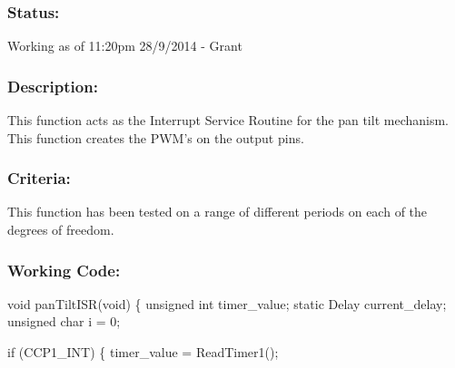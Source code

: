 \documentclass[]{article}
\begin{document}
\subsubsection{Status:}
Working as of 11:20pm 28/9/2014 - Grant

\subsubsection{Description:}
This function acts as the Interrupt Service Routine for the pan tilt mechanism. This function creates the PWM's on the output pins.

\subsubsection{Criteria:}
This function has been tested on a range of different periods on each of the degrees of freedom.

\subsubsection{Working Code:}
void panTiltISR(void)\newline
\{ \newline
	unsigned int timer\_value;\newline
	static Delay current\_delay;\newline
	unsigned char i = 0;\newline
	
	if (CCP1\_INT)\newline
	\{\newline
		timer\_value = ReadTimer1();\newline
		
\end{document}
